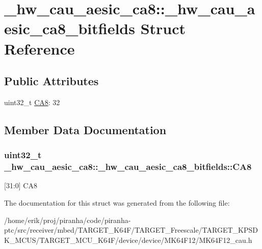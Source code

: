 \hypertarget{struct__hw__cau__aesic__ca8_1_1__hw__cau__aesic__ca8__bitfields}{}\section{\+\_\+hw\+\_\+cau\+\_\+aesic\+\_\+ca8\+:\+:\+\_\+hw\+\_\+cau\+\_\+aesic\+\_\+ca8\+\_\+bitfields Struct Reference}
\label{struct__hw__cau__aesic__ca8_1_1__hw__cau__aesic__ca8__bitfields}
\subsection*{Public Attributes}
\begin{DoxyCompactItemize}
\item 
uint32\+\_\+t \hyperlink{struct__hw__cau__aesic__ca8_1_1__hw__cau__aesic__ca8__bitfields_a81e39b095511fb120f9b8a235a7f2ae0}{C\+A8}\+: 32
\end{DoxyCompactItemize}


\subsection{Member Data Documentation}
\subsubsection[{\texorpdfstring{C\+A8}{CA8}}]{\setlength{\rightskip}{0pt plus 5cm}uint32\+\_\+t \+\_\+hw\+\_\+cau\+\_\+aesic\+\_\+ca8\+::\+\_\+hw\+\_\+cau\+\_\+aesic\+\_\+ca8\+\_\+bitfields\+::\+C\+A8}\hypertarget{struct__hw__cau__aesic__ca8_1_1__hw__cau__aesic__ca8__bitfields_a81e39b095511fb120f9b8a235a7f2ae0}{}\label{struct__hw__cau__aesic__ca8_1_1__hw__cau__aesic__ca8__bitfields_a81e39b095511fb120f9b8a235a7f2ae0}
\mbox{[}31\+:0\mbox{]} C\+A8 

The documentation for this struct was generated from the following file\+:\begin{DoxyCompactItemize}
\item 
/home/erik/proj/piranha/code/piranha-\/ptc/src/receiver/mbed/\+T\+A\+R\+G\+E\+T\+\_\+\+K64\+F/\+T\+A\+R\+G\+E\+T\+\_\+\+Freescale/\+T\+A\+R\+G\+E\+T\+\_\+\+K\+P\+S\+D\+K\+\_\+\+M\+C\+U\+S/\+T\+A\+R\+G\+E\+T\+\_\+\+M\+C\+U\+\_\+\+K64\+F/device/device/\+M\+K64\+F12/M\+K64\+F12\+\_\+cau.\+h\end{DoxyCompactItemize}
